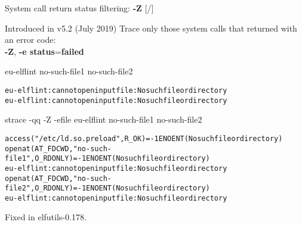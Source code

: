 \documentclass[unicode,aspectratio=169,xcolor={table,dvipsnames,usernames}]{beamer}
\begin{document}
\begin{frame}[fragile]{System call return status filtering: \textbf{-Z} \hfill [\insertframenumber/\inserttotalframenumber]}
\large
\begin{block}{Introduced in v5.2 (July 2019)}
Trace only those system calls that returned with an error code: \\
\textbf{-Z}, \textbf{-e status}=\textbf{failed}
\end{block}

\begin{block}{eu-elflint no-such-file1 no-such-file2}
\scriptsize
\begin{alltt}
eu-elflint: cannot open input file: No such file or directory
eu-elflint: cannot open input file: No such file or directory
\end{alltt}
\end{block}

\begin{block}{strace -qq -Z -efile eu-elflint no-such-file1 no-such-file2}
\scriptsize
\begin{alltt}
access("/etc/ld.so.preload", R_OK) = -1 ENOENT (No such file or directory)
openat(AT_FDCWD, "no-such-file1", O_RDONLY) = -1 ENOENT (No such file or directory)
eu-elflint: cannot open input file: No such file or directory
openat(AT_FDCWD, "no-such-file2", O_RDONLY) = -1 ENOENT (No such file or directory)
eu-elflint: cannot open input file: No such file or directory
\end{alltt}
\end{block}
Fixed in elfutils-0.178.
\end{frame}
\end{document}
